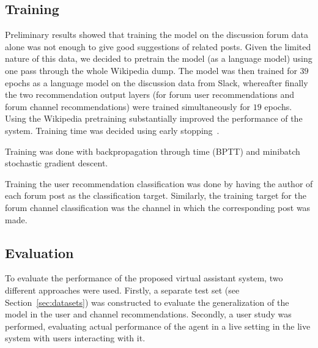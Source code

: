 \documentclass[11pt]{article}
\begin{document}

\vfill

\subsection{Training}

Preliminary results
showed that training
the model on the discussion forum data alone was not enough to give good suggestions of related posts.
Given the limited nature of this data, we decided to pretrain the model (as a language model) using one pass through the whole Wikipedia dump. The model was then trained for $39$ epochs as a language model on the discussion data from Slack, whereafter finally the two recommendation output layers (for forum user recommendations and forum channel recommendations) were trained simultaneously for $19$ epochs. Using the Wikipedia pretraining substantially improved the performance of the system. Training time was decided using early stopping~\cite{wang1994optimal}.

Training was done with backpropagation through time (BPTT) and minibatch stochastic gradient descent.

Training the user recommendation classification was done by having the author of each forum post as the classification target. Similarly, the training target for the forum channel classification was the channel in which the corresponding post was made.

\subsection{Evaluation}
\label{sec:evaluation}

To evaluate the performance of the proposed virtual assistant system, two different approaches were used. Firstly, a separate test set (see Section~\ref{sec:datasets}) was constructed to evaluate the generalization of the model in the user and channel recommendations. Secondly, a user study was performed, evaluating actual performance of the agent in a live setting in the live system with users interacting with it.

\vspace{2em}
\end{document}
